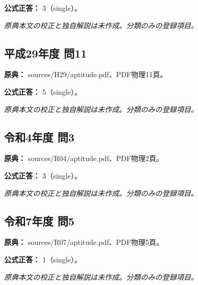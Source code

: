 \textbf{公式正答：} 3（single）。

\par\textit{原典本文の校正と独自解説は未作成。分類のみの登録項目。}

\subsection{平成29年度 問11}
\label{q:h29-reg-apt-11}

\noindent\textbf{原典：} sources/H29/aptitude.pdf、PDF物理11頁。

\textbf{公式正答：} 5（single）。

\par\textit{原典本文の校正と独自解説は未作成。分類のみの登録項目。}

\subsection{令和4年度 問3}
\label{q:r04-reg-apt-03}

\noindent\textbf{原典：} sources/R04/aptitude.pdf、PDF物理2頁。

\textbf{公式正答：} 3（single）。

\par\textit{原典本文の校正と独自解説は未作成。分類のみの登録項目。}

\subsection{令和7年度 問5}
\label{q:r07-reg-apt-05}

\noindent\textbf{原典：} sources/R07/aptitude.pdf、PDF物理5頁。

\textbf{公式正答：} 1（single）。

\par\textit{原典本文の校正と独自解説は未作成。分類のみの登録項目。}
